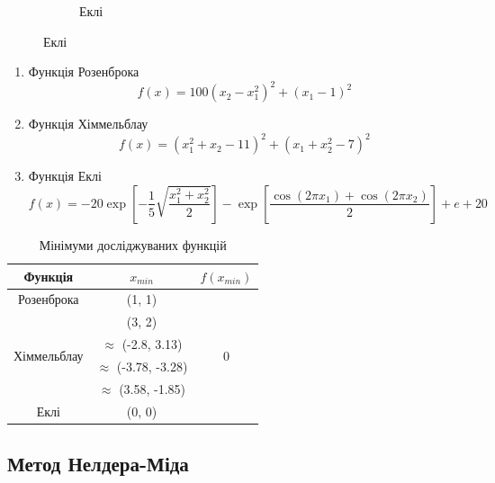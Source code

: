 \begin{figure}[h!]
\begin{subfigure}{0.3 \textwidth}
        \caption{Еклі}
    \end{subfigure}
\end{figure}

\begin{enumerate}
    \item Функція Розенброка
    $$ f(x) = 100(x_2-x_1^2)^2 + (x_1-1)^2 $$
    \item Функція Хіммельблау
    $$ f(x) = (x_1^2 + x_2 - 11)^2 + (x_1 + x_2^2 - 7)^2 $$
    \item Функція Еклі
    $$ f(x) = -20 \exp{\left[-\frac{1}{5} \sqrt{\frac{x_1^2 + x_2^2}{2}}\right]} -
    \exp{\left[\frac{\cos(2 \pi x_1) + \cos(2 \pi x_2)}{2}\right]} + e + 20 $$
\end{enumerate}

\clearpage
\begin{table}[h!]
    \centering
    \begin{tabular}{|c|c|c|}
        \hline
        Функція & $x_{min}$ & $f(x_{min})$ \\
        \hline
        Розенброка & (1, 1) &
        \multirow{6}{*}{0} \\ \cline{1-2}

        \multirow{4}{*}{Хіммельблау} &
        (3, 2) & \\ \cline{2-2}
        & $\approx$ (-2.8, 3.13) &  \\ \cline{2-2}
        & $\approx$ (-3.78, -3.28) &  \\ \cline{2-2}
        & $\approx$ (3.58, -1.85) &  \\ \cline{1-2}

        Еклі & (0, 0) & \\
        \hline
    \end{tabular}
    \caption{Мінімуми досліджуваних функцій}
\end{table}

\subsection*{Метод Нелдера-Міда}


